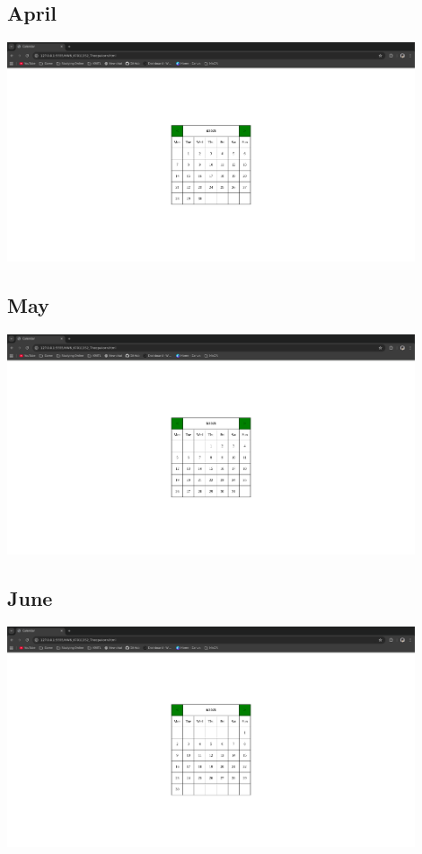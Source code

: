 \documentclass[12pt]{report} %
\begin{document}
\subsection*{April}
\includegraphics[width=12cm]{./images/Output04.png} \\
\subsection*{May}
\includegraphics[width=12cm]{./images/Output05.png} \\
\subsection*{June}
\includegraphics[width=12cm]{./images/Output06.png} \\
\end{document}
